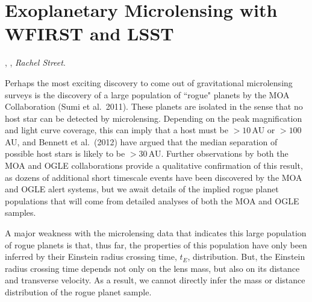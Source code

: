 %
%
%
%

\section{Exoplanetary Microlensing with WFIRST and LSST}
\def\secname{\chpname:microlensing}\label{sec:\secname}

,
,
{\it Rachel Street}.

Perhaps the most exciting discovery to come out of gravitational
microlensing surveys is the discovery of a large population of ``rogue"
planets by the MOA Collaboration (Sumi et al.\ 2011). These planets
are isolated in the sense that no host star can be detected
by microlensing. Depending on the peak magnification and light curve
coverage, this can imply that a host must be $> 10\,$AU or $> 100\,$AU,
and Bennett et al.\ (2012) have argued that the median separation
of possible host stars is likely to be $> 30\,$AU.
Further observations by both the MOA and OGLE collaborations provide
a qualitative confirmation of this result, as dozens of additional
short timescale events have been discovered by the MOA and OGLE
alert systems, but we await details of the implied rogue planet
populations that will come from detailed analyses of both the MOA
and OGLE samples.

A major weakness with the microlensing data that indicates this
large population of rogue planets is that, thus far, the properties
of this population have only been inferred by their Einstein radius
crossing time, $t_E$, distribution. But, the Einstein radius crossing
time depends not only on the lens mass, but also on its distance and
transverse velocity. As a result, we cannot directly infer the mass or distance
distribution of the rogue planet sample.

